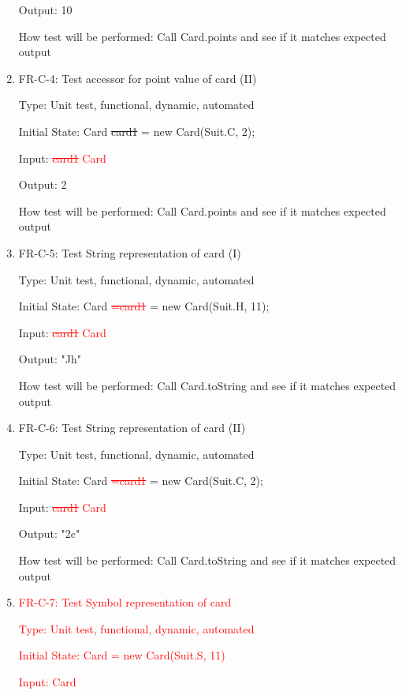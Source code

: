 \documentclass[12pt, titlepage]{article}
\begin{document}
\begin{enumerate}
    Output: 10
    					
    How test will be performed: Call Card.points and see if it matches expected output
    
    \item{FR-C-4: Test accessor for point value of card (II)}
    
    Type: Unit test, functional, dynamic, automated
    					
    Initial State: Card \sout{card1} = new Card(Suit.C, 2);
    					
    Input:  \textcolor{red}{\sout{card1} Card}
    					
    Output: 2
    					
    How test will be performed: Call Card.points and see if it matches expected output
    
    \item{FR-C-5: Test String representation of card (I)}
    
    Type: Unit test, functional, dynamic, automated
    					
    Initial State: Card \textcolor{red}{\sout{=card1}} = new Card(Suit.H, 11);
    					
    Input:  \textcolor{red}{\sout{card1} Card}
    					
    Output: "Jh"
    					
    How test will be performed: Call Card.toString and see if it matches expected output
    
    \item{FR-C-6: Test String representation of card (II)}
    
    Type: Unit test, functional, dynamic, automated
    					
    Initial State: Card \textcolor{red}{\sout{=card1}} = new Card(Suit.C, 2);
    					
    Input:  \textcolor{red}{\sout{card1} Card}
    					
    Output: "2c"
    					
    How test will be performed: Call Card.toString and see if it matches expected output
    
    
    \item \textcolor{red}{FR-C-7: Test Symbol representation of card}
    
    \textcolor{red}{Type: Unit test, functional, dynamic, automated}
    					
    \textcolor{red}{Initial State: Card  = new Card(Suit.S, 11)}
    					
    \textcolor{red}{Input:  Card}
    					

\end{enumerate}
\end{document}
